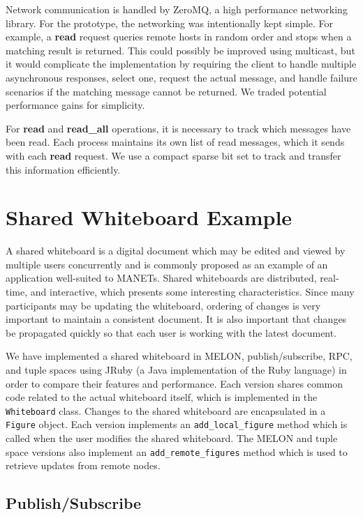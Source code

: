 \documentclass{llncs}
\begin{document}
Network communication is handled by ZeroMQ\cite{hintjens2013zeromq}, a high performance networking library. For the prototype, the networking was intentionally kept simple. For example, a \textbf{read} request queries remote hosts in random order and stops when a matching result is returned. This could possibly be improved using multicast, but it would complicate the implementation by requiring the client to handle multiple asynchronous responses, select one, request the actual message, and handle failure scenarios if the matching message cannot be returned. We traded potential performance gains for simplicity. 

For \textbf{read} and \textbf{read\_all} operations, it is necessary to track which messages have been read. Each process maintains its own list of read messages, which it sends with each \textbf{read} request. We use a compact sparse bit set to track and transfer this information efficiently.

\section{Shared Whiteboard Example}\label{sec:wb}

A shared whiteboard is a digital document which may be edited and viewed by multiple users concurrently and is commonly proposed as an example of an application well-suited to MANETs\cite{wb5}\cite{wb6}. Shared whiteboards are distributed, real-time, and interactive, which presents some interesting characteristics. Since many participants may be updating the whiteboard, ordering of changes is very important to maintain a consistent document. It is also important that changes be propagated quickly so that each user is working with the latest document.

We have implemented a shared whiteboard in MELON, publish/subscribe, RPC, and tuple spaces using JRuby (a Java implementation of the Ruby language) in order to compare their features and performance.
Each version shares common code related to the actual whiteboard itself, which is implemented in the \texttt{Whiteboard} class.
Changes to the shared whiteboard are encapsulated in a \texttt{Figure} object. Each version implements an \texttt{add\_local\_figure} method which is called when the user modifies the shared whiteboard.
The MELON and tuple space versions also implement an \texttt{add\_remote\_figures} method which is used to retrieve updates from remote nodes.

\subsection{Publish/Subscribe}
\end{document}
